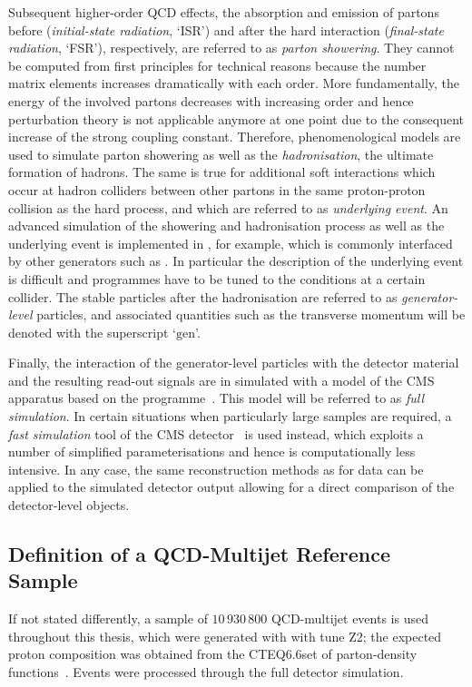 Subsequent higher-order QCD effects, \ie the absorption and emission of partons before (\textit{initial-state radiation}, `ISR') and after the hard interaction (\textit{final-state radiation}, `FSR'), respectively, are referred to as \textit{parton showering}.
They cannot be computed from first principles for technical reasons because the number matrix elements increases dramatically with each order.
More fundamentally, the energy of the involved partons decreases with increasing order and hence perturbation theory is not applicable anymore at one point due to the consequent increase of the strong coupling constant.
Therefore, phenomenological models are used to simulate parton showering as well as the \textit{hadronisation}, \ie the ultimate formation of hadrons.
The same is true for additional soft interactions which occur at hadron colliders between other partons in the same proton-proton collision as the hard process, and which are referred to as \textit{underlying event}.
An advanced simulation of the showering and hadronisation process as well as the underlying event is implemented in \pythia, for example, which is commonly interfaced by other generators such as \madgraph.
In particular the description of the underlying event is difficult and programmes have to be tuned to the conditions at a certain collider.
The stable particles after the hadronisation are referred to as \textit{generator-level} particles, and associated quantities such as the transverse momentum will be denoted with the superscript `$\text{gen}$'.

Finally, the interaction of the generator-level particles with the detector material and the resulting read-out signals are in simulated with a model of the CMS apparatus based on the \geant programme~\cite{Agostinelli2003250}.
This model will be referred to as \textit{full simulation}.
In certain situations when particularly large samples are required, a \textit{fast simulation} tool of the CMS detector~\cite{bib:CMS:FastSim} is used instead, which exploits a number of simplified parameterisations and hence is computationally less intensive.
In any case, the same reconstruction methods as for data can be applied to the simulated detector output allowing for a direct comparison of the detector-level objects.


\subsection{Definition of a QCD-Multijet Reference Sample}
If not stated differently, a sample of $10\,930\,800$ QCD-multijet events is used throughout this thesis, which were generated with \pythia{} with tune Z2\addref; the expected proton composition was obtained from the CTEQ6.6\tobechecked set of parton-density functions~\cite{PhysRevD.78.013004}.
Events were processed through the full detector simulation.

